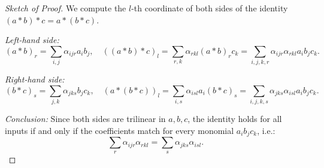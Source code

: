 \documentclass[12pt]{article}
\theoremstyle{definition}
\theoremstyle{plain}
\theoremstyle{remark}
\begin{document}
\begin{proof}[Sketch of Proof]
We compute the \(l\)-th coordinate of both sides of the identity \((a * b) * c = a * (b * c)\).

\medskip
\noindent\textit{Left-hand side:}
\[
(a * b)_r = \sum_{i,j} \alpha_{ijr} a_i b_j,\quad
((a * b) * c)_l = \sum_{r,k} \alpha_{rkl} (a * b)_r c_k = \sum_{i,j,k,r} \alpha_{ijr} \alpha_{rkl} a_i b_j c_k.
\]

\medskip
\noindent\textit{Right-hand side:}
\[
(b * c)_s = \sum_{j,k} \alpha_{jks} b_j c_k,\quad
(a * (b * c))_l = \sum_{i,s} \alpha_{isl} a_i (b * c)_s = \sum_{i,j,k,s} \alpha_{jks} \alpha_{isl} a_i b_j c_k.
\]

\medskip
\noindent\textit{Conclusion:}
Since both sides are trilinear in \(a, b, c\), the identity holds for all inputs if and only if the coefficients match for every monomial \(a_i b_j c_k\), i.e.:
\[
\sum_{r} \alpha_{ijr} \alpha_{rkl} = \sum_{s} \alpha_{jks} \alpha_{isl}.
\]
\end{proof}
\end{document}
